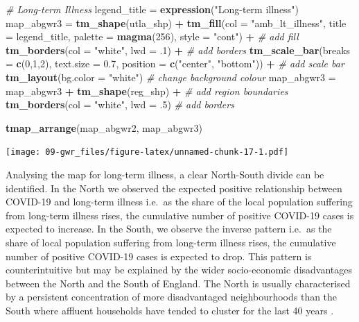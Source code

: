 \documentclass[
]{book}
\newenvironment{Shaded}{\begin{snugshade}}{\end{snugshade}}
\newcommand{\CommentTok}[1]{\textcolor[rgb]{0.56,0.35,0.01}{\textit{#1}}}
\newcommand{\DataTypeTok}[1]{\textcolor[rgb]{0.13,0.29,0.53}{#1}}
\newcommand{\DecValTok}[1]{\textcolor[rgb]{0.00,0.00,0.81}{#1}}
\newcommand{\FloatTok}[1]{\textcolor[rgb]{0.00,0.00,0.81}{#1}}
\newcommand{\KeywordTok}[1]{\textcolor[rgb]{0.13,0.29,0.53}{\textbf{#1}}}
\newcommand{\NormalTok}[1]{#1}
\newcommand{\OperatorTok}[1]{\textcolor[rgb]{0.81,0.36,0.00}{\textbf{#1}}}
\newcommand{\StringTok}[1]{\textcolor[rgb]{0.31,0.60,0.02}{#1}}
\begin{document}
\begin{Shaded}
\begin{Highlighting}[]
  \CommentTok{# Long-term Illness}
\NormalTok{legend_title =}\StringTok{ }\KeywordTok{expression}\NormalTok{(}\StringTok{"Long-term illness"}\NormalTok{)}
\NormalTok{map_abgwr3 =}\StringTok{ }\KeywordTok{tm_shape}\NormalTok{(utla_shp) }\OperatorTok{+}
\StringTok{  }\KeywordTok{tm_fill}\NormalTok{(}\DataTypeTok{col =} \StringTok{"amb_lt_illness"}\NormalTok{, }\DataTypeTok{title =}\NormalTok{ legend_title, }\DataTypeTok{palette =} \KeywordTok{magma}\NormalTok{(}\DecValTok{256}\NormalTok{), }\DataTypeTok{style =} \StringTok{"cont"}\NormalTok{) }\OperatorTok{+}\StringTok{ }\CommentTok{# add fill}
\StringTok{  }\KeywordTok{tm_borders}\NormalTok{(}\DataTypeTok{col =} \StringTok{"white"}\NormalTok{, }\DataTypeTok{lwd =} \FloatTok{.1}\NormalTok{)  }\OperatorTok{+}\StringTok{ }\CommentTok{# add borders}
\StringTok{  }\KeywordTok{tm_scale_bar}\NormalTok{(}\DataTypeTok{breaks =} \KeywordTok{c}\NormalTok{(}\DecValTok{0}\NormalTok{,}\DecValTok{1}\NormalTok{,}\DecValTok{2}\NormalTok{), }\DataTypeTok{text.size =} \FloatTok{0.7}\NormalTok{, }\DataTypeTok{position =}  \KeywordTok{c}\NormalTok{(}\StringTok{"center"}\NormalTok{, }\StringTok{"bottom"}\NormalTok{)) }\OperatorTok{+}\StringTok{ }\CommentTok{# add scale bar}
\StringTok{  }\KeywordTok{tm_layout}\NormalTok{(}\DataTypeTok{bg.color =} \StringTok{"white"}\NormalTok{) }\CommentTok{# change background colour}
\NormalTok{map_abgwr3 =}\StringTok{ }\NormalTok{map_abgwr3 }\OperatorTok{+}\StringTok{ }\KeywordTok{tm_shape}\NormalTok{(reg_shp) }\OperatorTok{+}\StringTok{ }\CommentTok{# add region boundaries}
\StringTok{  }\KeywordTok{tm_borders}\NormalTok{(}\DataTypeTok{col =} \StringTok{"white"}\NormalTok{, }\DataTypeTok{lwd =} \FloatTok{.5}\NormalTok{) }\CommentTok{# add borders}

\KeywordTok{tmap_arrange}\NormalTok{(map_abgwr2, map_abgwr3)}
\end{Highlighting}
\end{Shaded}

\texttt{[image: 09-gwr\_files/figure-latex/unnamed-chunk-17-1.pdf]}

Analysing the map for long-term illness, a clear North-South divide can be identified. In the North we observed the expected positive relationship between COVID-19 and long-term illness i.e.~as the share of the local population suffering from long-term illness rises, the cumulative number of positive COVID-19 cases is expected to increase. In the South, we observe the inverse pattern i.e.~as the share of local population suffering from long-term illness rises, the cumulative number of positive COVID-19 cases is expected to drop. This pattern is counterintuitive but may be explained by the wider socio-economic disadvantages between the North and the South of England. The North is usually characterised by a persistent concentration of more disadvantaged neighbourhoods than the South where affluent households have tended to cluster for the last 40 years \citep{rowe2020policy}.
\end{document}
